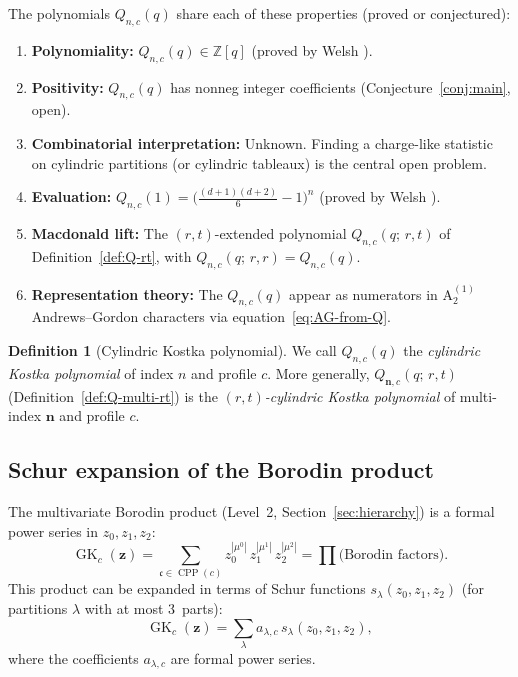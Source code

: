 \documentclass[11pt]{article}
\theoremstyle{plain}
\theoremstyle{definition}
\newtheorem{definition}[theorem]{Definition}
\newcommand{\Z}{\mathbb{Z}}
\newcommand{\GK}{\operatorname{GK}}
\newcommand{\CPP}{\operatorname{CPP}}
\begin{document}
The polynomials $Q_{n,c}(q)$ share each of these properties
(proved or conjectured):
\begin{enumerate}
  \item[(C1)] \textbf{Polynomiality:}
    $Q_{n,c}(q) \in \Z[q]$ (proved by Welsh \cite{Welsh}).
  \item[(C2)] \textbf{Positivity:}
    $Q_{n,c}(q)$ has nonneg integer coefficients
    (Conjecture~\ref{conj:main}, open).
  \item[(C3)] \textbf{Combinatorial interpretation:}
    Unknown.  Finding a charge-like statistic on cylindric
    partitions (or cylindric tableaux) is the central open problem.
  \item[(C4)] \textbf{Evaluation:}
    $Q_{n,c}(1) = \bigl(\frac{(d+1)(d+2)}{6} - 1\bigr)^n$
    (proved by Welsh \cite{Welsh}).
  \item[(C5)] \textbf{Macdonald lift:}
    The $(r,t)$-extended polynomial $Q_{n,c}(q;\,r,t)$
    of Definition~\ref{def:Q-rt}, with
    $Q_{n,c}(q;\,r,r) = Q_{n,c}(q)$.
  \item[(C6)] \textbf{Representation theory:}
    The $Q_{n,c}(q)$ appear as numerators in $\mathrm{A}_2^{(1)}$
    Andrews--Gordon characters via equation~\eqref{eq:AG-from-Q}.
\end{enumerate}

\begin{definition}[Cylindric Kostka polynomial]
\label{def:cyl-kostka}
We call $Q_{n,c}(q)$ the \emph{cylindric Kostka polynomial} of
index $n$ and profile $c$.  More generally,
$Q_{\mathbf{n},c}(q;\,r,t)$ (Definition~\ref{def:Q-multi-rt})
is the \emph{$(r,t)$-cylindric Kostka polynomial} of multi-index
$\mathbf{n}$ and profile $c$.
\end{definition}

\subsection{Schur expansion of the Borodin product}

The multivariate Borodin product (Level~2, Section~\ref{sec:hierarchy})
is a formal power series in $z_0, z_1, z_2$:
\[
  \GK_c(\mathbf{z})
  = \sum_{\mathfrak{c} \in \CPP(c)}
  z_0^{|\mu^0|}\, z_1^{|\mu^1|}\, z_2^{|\mu^2|}
  = \prod \text{(Borodin factors)}.
\]
This product can be expanded in terms of Schur functions
$s_\lambda(z_0, z_1, z_2)$ (for partitions $\lambda$ with at most
3~parts):
\begin{equation}
  \GK_c(\mathbf{z})
  = \sum_\lambda a_{\lambda,c}\, s_\lambda(z_0, z_1, z_2),
  \label{eq:schur-expansion}
\end{equation}
where the coefficients $a_{\lambda,c}$ are formal power series.
\end{document}
